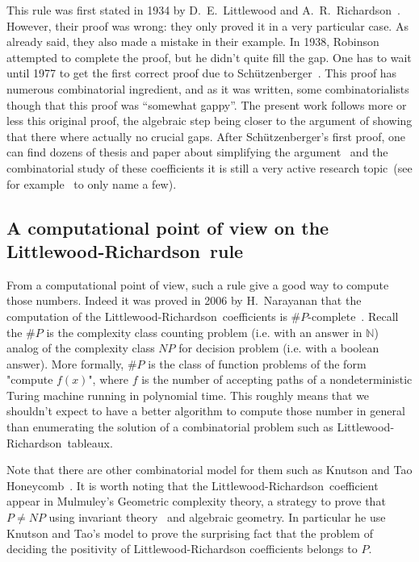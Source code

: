\documentclass[12pt,a4paper]{article}
\newcommand{\LR}{Littlewood-Richardson\ }
\newcommand{\N}{{\mathbb N}}
\begin{document}
This rule was first stated in 1934 by D.~E.~Littlewood and
A.~R.~Richardson~\cite{LR}. However, their proof was wrong: they only proved
it in a very particular case. As already said, they also made a mistake in
their example. In 1938, Robinson~\cite{Robinson} attempted to complete the
proof, but he didn't quite fill the gap. One has to wait until 1977 to get the
first correct proof due to Schützenberger~\cite{SchutzLR}. This proof has
numerous combinatorial ingredient, and as it was written, some
combinatorialists though that this proof was ``somewhat gappy''. The present
work follows more or less this original proof, the algebraic step being closer
to the argument of \cite{NCSF7} showing that there where actually no crucial
gaps. After Schützenberger's first proof, one can find dozens of thesis and
paper about simplifying the argument~\cite{Zelevinsky81,Macdonald95,Gasharov98,DHT01,VanLeeuwen01,Stembridge02}
and the combinatorial study of these coefficients it is still a very active
research topic~(see for example~\cite{qAnalogs,KingToumazetTollu,KnutsonTao}
to only name a few).

\subsection{A computational point of view on the \LR rule}

From a computational point of view, such a rule give a good way to compute
those numbers. Indeed it was proved in 2006 by H.~Narayanan that the
computation of the \LR coefficients is
$\#P$-complete~\cite{Narayanan06}. Recall the $\#P$ is the complexity class
counting problem (i.e. with an answer in $\N$) analog of the complexity class
$NP$ for decision problem (i.e. with a boolean answer). More formally, $\#P$
is the class of function problems of the form "compute $f(x)$", where $f$ is
the number of accepting paths of a nondeterministic Turing machine running in
polynomial time. This roughly means that we shouldn't expect to have a better
algorithm to compute those number in general than enumerating the solution of
a combinatorial problem such as \LR tableaux.

Note that there are other combinatorial model for them such as Knutson and Tao
Honeycomb~\cite{KnutsonTao}. It is worth noting that the \LR coefficient
appear in Mulmuley's Geometric complexity theory, a strategy to prove that
$P\neq NP$ using invariant theory~\cite{Mulmuley} and algebraic geometry. In
particular he use Knutson and Tao's model to prove the surprising fact that
the problem of deciding the positivity of Littlewood-Richardson coefficients
belongs to $P$.
\end{document}
